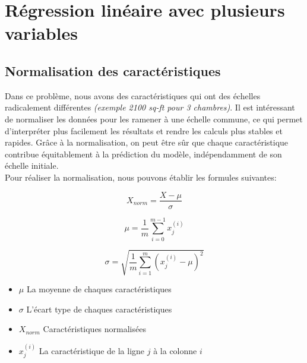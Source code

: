 \section{Régression linéaire avec plusieurs variables}
\subsection{Normalisation des caractéristiques}

Dans ce problème, nous avons des caractéristiques qui ont des échelles radicalement différentes \textit{(exemple 2100 sq-ft pour 3 chambres)}. Il est intéressant de normaliser les données pour les ramener à une échelle commune, 
ce qui permet d'interpréter plus facilement les résultats et rendre les calculs plus stables et rapides. Grâce à la normalisation, on peut être sûr que chaque caractéristique contribue équitablement à la prédiction du modèle, indépendamment de son échelle initiale. \\

\noindent
Pour réaliser la normalisation, nous pouvons établir les formules suivantes:

\begin{figure}[!h]
    \centering
    \begin{minipage}{.33\linewidth}
        \begin{equation*}
            X_{norm} = \frac{X - \mu}{\sigma}
        \end{equation*}
    \end{minipage}\hfill\vline
    \begin{minipage}{.33\linewidth}
        \begin{equation*}
            \mu = \frac{1}{m} \sum_{i=0}^{m-1}x_j^{(i)}
        \end{equation*}        
    \end{minipage}\hfill\vline
    \begin{minipage}{.33\linewidth}
        \begin{equation*}
            \sigma = \sqrt{\frac{1}{m} \sum_{i=1}^{m} \left(x_j^{(i)} - \mu\right)^2}
        \end{equation*}                
    \end{minipage}
\end{figure}

\begin{itemize}
    \item $\mu$ La moyenne de chaques caractéristiques
    \item $\sigma$ L'écart type de chaques caractéristiques
    \item $X_{norm}$ Caractéristiques normalisées
    \item $x_j^{(i)}$ La caractéristique de la ligne $j$ à la colonne $i$
\end{itemize}

